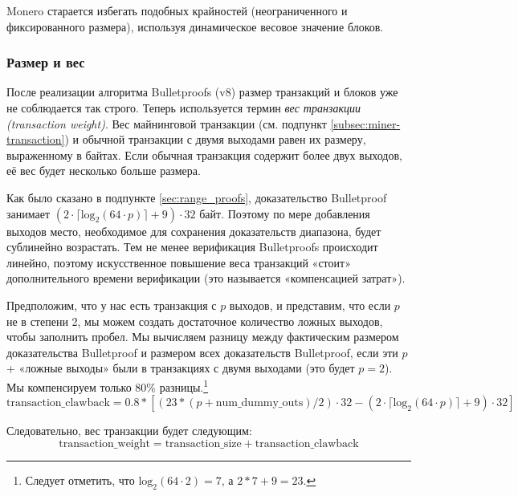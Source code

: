 Monero старается избегать подобных крайностей (неограниченного и фиксированного разме\-ра), используя динамическое весовое значение блоков.

\subsubsection*{Размер и вес}

После реализации алгоритма Bulletproofs (v8) размер транзакций и блоков уже не соблюдается так строго. Теперь используется термин {\em вес транзакции (transaction weight)}. Вес майнинговой транзакции (см. подпункт \ref{subsec:miner-transaction}) и обычной транзакции с двумя выходами равен их размеру, выраженному в байтах. Если обычная транзакция содержит более двух выходов, её вес будет несколько больше размера.

Как было сказано в подпункте \ref{sec:range_proofs}, доказательство Bulletproof занимает $(2 \cdot \lceil \textrm{log}_2(64 \cdot p) \rceil + 9) \cdot 32$ байт. Поэтому по мере добавления выходов место, необходимое для сохранения доказательств диапазона, будет сублинейно возрастать. Тем не менее верификация Bulletproofs происходит линейно, поэтому искусственное повышение веса транзакций «стоит» дополнительного време\-ни верификации (это называется «компенсацией затрат»).%

Предположим, что у нас есть транзакция с $p$ выходов, и представим, что если $p$ не в степени 2, мы можем создать достаточное количество ложных выходов, чтобы заполнить пробел. Мы вычисляем разницу между фактическим размером доказательства Bulletproof и размером всех доказательств Bulletproof, если эти $p$ + «ложные выходы» были в транзакциях с двумя выходами (это будет $p = 2$). Мы компенсируем только 80\% разницы.\footnote{Следует отметить, что $\textrm{log}_2(64 \cdot 2) = 7$, а $2*7 + 9 = 23$.}\vspace{.175cm}
\[\textrm{transaction\_clawback} = 0.8*[(23*(p + \textrm{num\_dummy\_outs})/2) \cdot 32 - (2 \cdot \lceil \textrm{log}_2(64 \cdot p) \rceil + 9) \cdot 32]\]

Следовательно, вес транзакции будет следующим:\vspace{.175cm}
\[\textrm{transaction\_weight} = \textrm{transaction\_size} + \textrm{transaction\_clawback}\]

